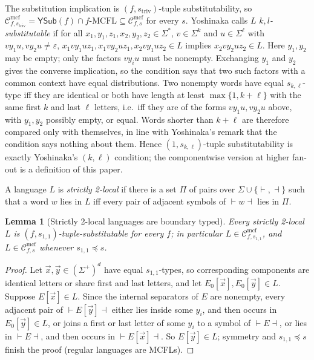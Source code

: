 \documentclass[11pt]{article}
\numberwithin{equation}{section}
\theoremstyle{plain}
\newtheorem{lemma}[theorem]{Lemma}
\theoremstyle{definition}
\theoremstyle{remark}
\newcommand{\Cmcf}[2]{\mathcal{C}^{\mathrm{mcf}}_{#1,#2}}
\newcommand{\tuple}[1]{\vec{#1}}
\newcommand{\eps}{\varepsilon}
\newcommand{\YSub}[1]{\mathsf{YSub}(#1)}
\begin{document}
The substitution implication is $(f,s_{\mathrm{triv}})$-tuple substitutability,
so $\Cmcf{f}{s_{\mathrm{triv}}}=\YSub{f}\cap f\text{-}\mathrm{MCFL}\subseteq\Cmcf{f}{s}$
for every $s$.  Yoshinaka \cite[Definition~2]{Yoshinaka2008} calls $L$
\emph{$k,l$-substitutable} if for all $x_1,y_1,z_1,x_2,y_2,z_2\in\Sigma^*$,
$v\in\Sigma^k$ and $u\in\Sigma^\ell$ with $vy_1u,vy_2u\ne\eps$,
$x_1vy_1uz_1,x_1vy_2uz_1,x_2vy_1uz_2\in L$ implies $x_2vy_2uz_2\in L$.  Here
$y_1,y_2$ may be empty; only the factors $vy_iu$ must be nonempty.  Exchanging
$y_1$ and $y_2$ gives the converse implication, so the condition says that two
such factors with a common context have equal distributions.  Two nonempty words
have equal $s_{k,\ell}$-type iff they are identical or both have length at least
$\max\{1,k+\ell\}$ with the same first $k$ and last $\ell$ letters, i.e.\ iff they
are of the forms $vy_1u,vy_2u$ above, with $y_1,y_2$ possibly empty, or equal.
Words shorter than $k+\ell$ are therefore compared only with themselves, in line
with Yoshinaka's remark that the condition says nothing about them.  Hence
$(1,s_{k,\ell})$-tuple substitutability is exactly Yoshinaka's $(k,\ell)$
condition; the componentwise version at higher fan-out is a definition of this
paper.

A language $L$ is \emph{strictly 2-local} if there is a set $\Pi$ of pairs over
$\Sigma\cup\{\vdash,\dashv\}$ such that a word $w$ lies in $L$ iff every pair of
adjacent symbols of $\vdash w\dashv$ lies in $\Pi$.

\begin{lemma}[Strictly 2-local languages are boundary typed]
\label{lem:sl2-boundary-control}
Every strictly 2-local $L$ is $(f,s_{1,1})$-tuple-substitutable for every $f$; in
particular $L\in\Cmcf{f}{s_{1,1}}$, and $L\in\Cmcf{f}{s}$ whenever $s_{1,1}\preceq s$.
\end{lemma}

\begin{proof}
Let $\tuple x,\tuple y\in(\Sigma^+)^d$ have equal $s_{1,1}$-types, so
corresponding components are identical letters or share first and last letters,
and let $E_0[\tuple x],E_0[\tuple y]\in L$.  Suppose $E[\tuple x]\in L$.  Since the
internal separators of $E$ are nonempty, every adjacent pair of
$\vdash E[\tuple y]\dashv$ either lies inside some $y_i$, and then occurs in
$E_0[\tuple y]\in L$, or joins a first or last letter of some $y_i$ to a symbol of
$\vdash E\dashv$, or lies in $\vdash E\dashv$, and then occurs in
$\vdash E[\tuple x]\dashv$.  So $E[\tuple y]\in L$; symmetry and $s_{1,1}\preceq s$
finish the proof (regular languages are MCFLs).
\end{proof}
\end{document}
